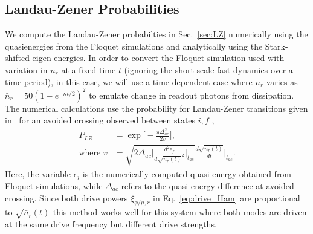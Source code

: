 \documentclass[%
reprint,
superscriptaddress,
 amsmath,amssymb,
 aps,
 prx,
longbibliography,
floatfix,
]{revtex4-2}
\begin{document}
\subsection{Landau-Zener Probabilities}\label{app:LZ}
We compute the Landau-Zener probabilties in Sec.~\ref{sec:LZ} numerically using the quasienergies from the Floquet simulations and analytically using the Stark-shifted eigen-energies. In order to convert the Floquet simulation used with variation in $\bar n_r$ at a fixed time $t$ (ignoring the short scale fast dynamics over a time period), in this case, we will use a time-dependent case where $\bar n_r$ varies as $\bar n_r=50(1-e^{-\kappa t/2})^2$ to emulate change in readout photons from dissipation. The numerical calculations use the probability for Landau-Zener transitions given in~\cite{ikeda2022floquet} for an avoided crossing observed between states $i,f$ ,
\begin{align}
    P_{LZ}&=\exp{\Big[-\frac{\pi \Delta_{ac}^2}{2v}\Big]},\\
    \text{where } v&=\sqrt{2\Delta_{ac}\Big|\frac{d^2\epsilon_f}{d\sqrt{\bar{n}_r(t)}^2}\Big|_{t_{ac}}}\frac{d\sqrt{\bar{n}_r(t)}}{dt}|_{t_{ac}}\Big.
\end{align}
Here, the variable $\epsilon_j$ is the numerically computed quasi-energy obtained from Floquet simulations, while $\Delta_{ac}$ refers to the quasi-energy difference at avoided crossing. Since both drive powers $\xi_{\phi/\mu,r}$ in Eq.~\ref{eq:drive_Ham} are proportional to $\sqrt{\bar n_r(t)}$ this method works well for this system where both modes are driven at the same drive frequency but different drive strengths.
\end{document}
